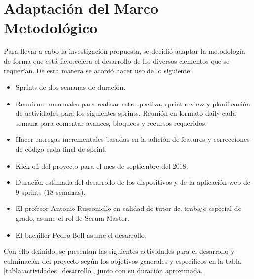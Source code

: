 \section{Adaptación del Marco Metodológico}
Para llevar a cabo la investigación propuesta, se decidió adaptar la metodología de forma que está favoreciera el desarrollo de los diversos elementos que se requerían. De esta manera se acordó hacer uso de lo siguiente:
\begin{itemize}
\item Sprints de dos semanas de duración.
\item Reuniones mensuales para realizar retrospectiva, sprint review y planificación de actividades para los siguientes sprints. Reunión en formato daily cada semana para comentar avances, bloqueos y recursos requeridos.  
\item Hacer entregas incrementales basadas en la adición de features y correcciones de código cada final de sprint.
\item Kick off del proyecto para el mes de septiembre del 2018.
\item Duración estimada del desarrollo de los dispositivos y de la aplicación web de 9 sprints (18 semanas).
\item El profesor Antonio Russoniello en calidad de tutor del trabajo especial de grado, asume el rol de Scrum Master. 
\item El bachiller Pedro Boll asume el desarrollo. 
\end{itemize}
Con ello definido, se presentan las siguientes actividades para el desarrollo y culminación del proyecto según los objetivos generales y especificos en la  tabla \ref{tabla:actividades_desarrollo}, junto con su duración aproximada.

